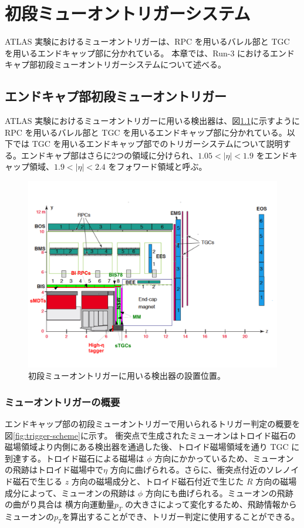 \chapter{初段ミューオントリガーシステム}\label{chapter3}
ATLAS 実験におけるミューオントリガーは、RPC を用いるバレル部と TGC を用いるエンドキャップ部に分かれている。
本章では、Run-3 におけるエンドキャプ部初段ミューオントリガーシステムについて述べる。

\section{エンドキャプ部初段ミューオントリガー}
ATLAS 実験におけるミューオントリガーに用いる検出器は、図\ref{fig:muon}に示すように RPC を用いるバレル部と TGC を用いるエンドキャップ部に分かれている。以下では TGC を用いるエンドキャップ部でのトリガーシステムについて説明する。エンドキャプ部はさらに2つの領域に分けられ、$1.05 < |\eta| < 1.9$ をエンドキャップ領域、$1.9 < |\eta| < 2.4$ をフォワード領域と呼ぶ。
\begin{figure}[tb]
  \centering
  \includegraphics[clip, width=14cm]{fig/2/ch01_fig_03a.pdf}
  \caption{初段ミューオントリガーに用いる検出器の設置位置。}
  \label{fig:muon}
\end{figure}

\subsection{ミューオントリガーの概要}\label{section:CW}
エンドキャップ部の初段ミューオントリガーで用いられるトリガー判定の概要を図\ref{fig:trigger-scheme}に示す。
衝突点で生成されたミューオンはトロイド磁石の磁場領域より内側にある検出器を通過した後、トロイド磁場領域を通り TGC に到達する。トロイド磁石による磁場は $\phi$ 方向にかかっているため、ミューオンの飛跡はトロイド磁場中で$\eta$ 方向に曲げられる。さらに、衝突点付近のソレノイド磁石で生じる $z$ 方向の磁場成分と、トロイド磁石付近で生じた $R$ 方向の磁場成分によって、ミューオンの飛跡は $\phi$ 方向にも曲げられる。ミューオンの飛跡の曲がり具合は 横方向運動量$p_T$ の大きさによって変化するため、飛跡情報からミューオンの$p_T$を算出することができ、トリガー判定に使用することができる。

